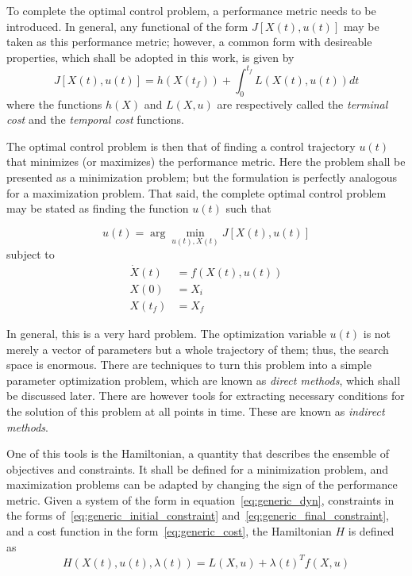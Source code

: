 To complete the optimal control problem, a performance metric needs to be introduced. In general, any functional of the form \(J[X(t), u(t)]\) may be taken as this performance metric; however, a common form with desireable properties, which shall be adopted in this work, is given by
\begin{equation} \label{eq:generic_cost}
    J[X(t), u(t)] = h(X(t_f)) + \int_0^{t_f} L(X(t), u(t)) dt
\end{equation}
where the functions \(h(X)\) and \(L(X, u)\) are respectively called the \textit{terminal cost} and the \textit{temporal cost} functions.\

The optimal control problem is then that of finding a control trajectory \(u(t)\) that minimizes (or maximizes) the performance metric. Here the problem shall be presented as a minimization problem; but the formulation is perfectly analogous for a maximization problem. That said, the complete optimal control problem may be stated as finding the function \(u(t)\) such that

\begin{equation} \label{eq:argmin_cost}
    u(t) = \arg \min_{u(t), X(t)} J[X(t), u(t)]
\end{equation}
subject to
\begin{align}
    \dot X(t) &= f(X(t), u(t)) \\
    X(0) &= X_i \\
    X(t_f) &= X_f
\end{align}

In general, this is a very hard problem. The optimization variable \(u(t)\) is not merely a vector of parameters but a whole trajectory of them; thus, the search space is enormous. There are techniques to turn this problem into a simple parameter optimization problem, which are known as \textit{direct methods}, which shall be discussed later. There are however tools for extracting necessary conditions for the solution of this problem at all points in time. These are known as \textit{indirect methods}.

One of this tools is the Hamiltonian, a quantity that describes the ensemble of objectives and constraints. It shall be defined for a minimization problem, and maximization problems can be adapted by changing the sign of the performance metric. Given a system of the form in equation~\eqref{eq:generic_dyn}, constraints in the forms of~\eqref{eq:generic_initial_constraint} and~\eqref{eq:generic_final_constraint}, and a cost function in the form~\eqref{eq:generic_cost}, the Hamiltonian \(H\) is defined as
\begin{equation}
    H(X(t), u(t), \lambda(t)) = L(X, u) + \lambda{(t)}^T f(X, u)
\end{equation}

